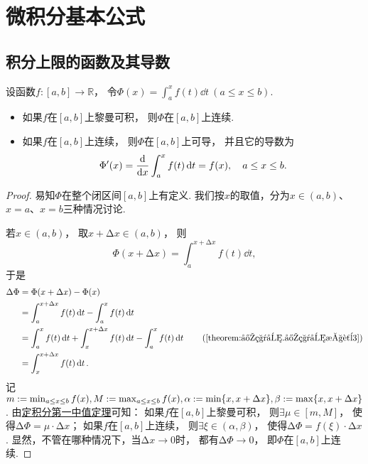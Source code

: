 \section{微积分基本公式}
\subsection{积分上限的函数及其导数}
\begin{theorem}\label{theorem:定积分.变限积分定理}
设函数\(f\colon[a,b]\to\mathbb{R}\)，
令\(\Phi(x)
= \int_a^x f(t) \dd{t}
\ (a \leq x \leq b)\).
\begin{itemize}
	\item 如果\(f\)在\([a,b]\)上黎曼可积，
	则\(\Phi\)在\([a,b]\)上连续.

	\item 如果\(f\)在\([a,b]\)上连续，
	则\(\Phi\)在\([a,b]\)上可导，
	并且它的导数为\begin{equation*}
		\Phi'(x)
		= \dv{x} \int_a^x f(t) \dd{t}
		= f(x),
		\quad a \leq x \leq b.
	\end{equation*}
\end{itemize}
\begin{proof}
易知\(\Phi\)在整个闭区间\([a,b]\)上有定义.
我们按\(x\)的取值，分为\(x\in(a,b)\)、\(x=a\)、\(x=b\)三种情况讨论.

若\(x\in(a,b)\)，
取\(x + \increment x \in (a,b)\)，
则\begin{equation*}
	\Phi(x + \increment x) = \int_a^{x+\increment x} f(t) \dd{t},
\end{equation*}
于是\begin{align*}
	\increment\Phi
	&= \Phi(x + \increment x) - \Phi(x) \\
	&= \int_a^{x+\increment x} f(t) \dd{t} - \int_a^x f(t) \dd{t} \\
	&= \int_a^x f(t) \dd{t} + \int_x^{x+\increment x} f(t) \dd{t} - \int_a^x f(t) \dd{t}
		\tag{\cref{theorem:定积分.定积分性质3}} \\
	&= \int_x^{x+\increment x} f(t) \dd{t}.
\end{align*}
记\(m := \min_{a \leq x \leq b} f(x),
M := \max_{a \leq x \leq b} f(x),
\alpha := \min\{x,x+\Delta x\},
\beta := \max\{x,x+\Delta x\}\).
由\hyperref[theorem:定积分.积分中值定理1]{定积分第一中值定理}可知：
如果\(f\)在\([a,b]\)上黎曼可积，
则\(\exists\mu\in[m,M]\)，
使得\(\increment\Phi = \mu \cdot \increment x\)；
如果\(f\)在\([a,b]\)上连续，
则\(\exists\xi\in(\alpha,\beta)\)，
使得\(\increment\Phi = f(\xi) \cdot \increment x\).
显然，不管在哪种情况下，当\(\increment x\to0\)时，
都有\(\increment\Phi\to0\)，
即\(\Phi\)在\([a,b]\)上连续.


\end{proof}
\end{theorem}
